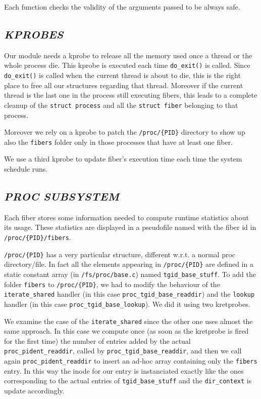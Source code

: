 \documentclass[a4paper]{article}
\begin{document}
Each function checks the validity of the arguments passed to be always safe.

\subsection*{\textit{KPROBES}}
Our module needs a kprobe to release all the memory used once a thread or the whole process die. This kprobe is executed each time \texttt{do\_exit()} is called. Since \texttt{do\_exit()} is called when the current thread is about to die, this is the right place to free all our structures regarding that thread. Moreover if the current thread is the last one in the process still executing fibers, this leads to a complete cleanup of the \texttt{struct process} and all the \texttt{struct fiber} belonging to that process.

Moreover we rely on a kprobe to patch the \texttt{/proc/\{PID\}} directory to show up also the \texttt{fibers} folder only in those processes that have at least one fiber.

We use a third kprobe to update fiber's execution time each time the system schedule runs.

\subsection*{\textit{PROC SUBSYSTEM}}
Each fiber stores some information needed to compute runtime statistics about its usage. These statistics are displayed in a pseudofile named with the fiber id in \texttt{/proc/\{PID\}/fibers}.

\texttt{/proc/\{PID\}} has a very particular structure, different w.r.t. a normal proc directory/file. In fact all the elements appearing in \texttt{/proc/\{PID\}} are defined in a static constant array (in \texttt{/fs/proc/base.c}) named \texttt{tgid\_base\_stuff}.
To add the folder \texttt{fibers} to \texttt{/proc/\{PID\}}, we had to modify the behaviour of the \texttt{iterate\_shared} handler (in this case \texttt{proc\_tgid\_base\_readdir}) and the \texttt{lookup} handler (in this case \texttt{proc\_tgid\_base\_lookup}). We did it using two kretprobes.

We examine the case of the \texttt{iterate\_shared} since the other one uses almost the same approach. In this case we compute once (as soon as the kretprobe is fired for the first time) the number of entries added by the actual \texttt{proc\_pident\_readdir}, called by \texttt{proc\_tgid\_base\_readdir}, and then we call again \texttt{proc\_pident\_readdir} to insert an ad-hoc array containing only the \texttt{fibers} entry. In this way the inode for our entry is instanciated exactly like the ones corresponding to the actual entries of \texttt{tgid\_base\_stuff} and the \texttt{dir\_context} is update accordingly.
\end{document}
